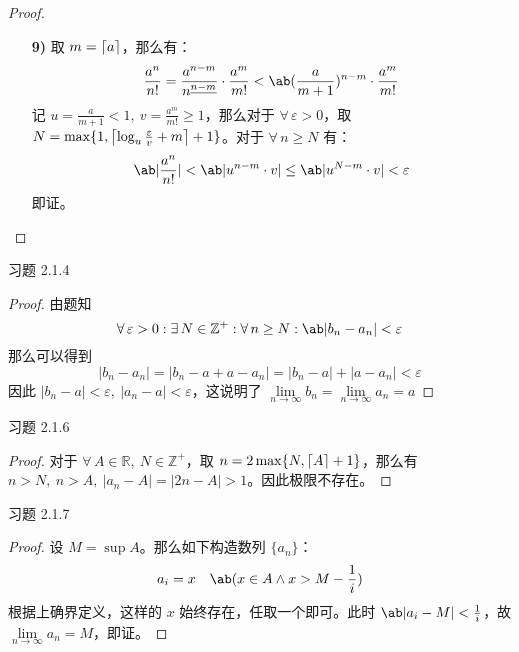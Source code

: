 \begin{problem}
\begin{proof}
\begin{itemize}
			\item[\textbf{9)}] 取 $m = \ceil{a}$，那么有：
			$$
			\frac{a^n}{n!} = \frac{a^{n-m}}{n^{\underline{n-m}}} \cdot \frac{a^m}{m!} < \ab(\frac{a}{m+1})^{n-m} \cdot \frac{a^m}{m!}
			$$
			记 $u = \frac{a}{m+1} < 1,\ v = \frac{a^m}{m!} \ge 1$，那么对于 $\forall\,\varepsilon > 0$，取 $N = \max\{1,\ceil*{\log_u \frac{\varepsilon}{v} + m} + 1\}$。对于 $\forall\,n \ge N$ 有：
			$$
			\ab|\frac{a^n}{n!}| < \ab|u^{n-m} \cdot v| \le \ab|u^{N-m} \cdot v| < \varepsilon
			$$
			即证。
		\end{itemize}
	\end{proof}
\end{problem}

\begin{problem}
	习题 2.1.4
	\begin{proof}
		由题知
		$$
		\forall\,\varepsilon > 0: \exists\,N \in \mathbb{Z}^+: \forall\,n \ge N: \ab|b_n - a_n| < \varepsilon
		$$
		那么可以得到
		$$
		|b_n - a_n| = |b_n - a + a - a_n| = |b_n - a| + |a - a_n| < \varepsilon
		$$
		因此 $|b_n - a| < \varepsilon,\ |a_n - a| < \varepsilon$，这说明了 $\lim\limits_{n \to \infty} b_n = \lim\limits_{n \to \infty} a_n = a$
	\end{proof}
\end{problem}

\begin{problem}
	习题 2.1.6
	\begin{proof}
		对于 $\forall\,A \in \mathbb{R},\ N \in \mathbb{Z}^+$，取 $n = 2\max\{N,\ceil*{A} + 1\}$，那么有 $n > N,\ n > A,\ |a_n - A| = |2n - A| > 1$。因此极限不存在。
	\end{proof}
\end{problem}

\begin{problem}
	习题 2.1.7
	\begin{proof}
		设 $M = \sup A$。那么如下构造数列 $\{a_n\}$：
		$$
		a_i = x \quad \ab(x \in A \land x > M - \frac{1}{i})
		$$
		根据上确界定义，这样的 $x$ 始终存在，任取一个即可。此时 $\ab|a_i - M| < \frac{1}{i}$，故 $\lim\limits_{n \to \infty} a_n = M$，即证。
	\end{proof}
\end{problem}

